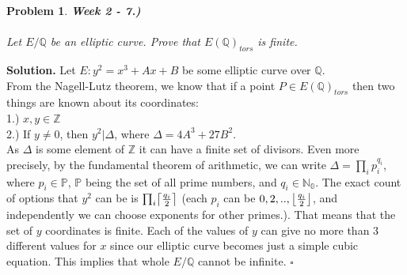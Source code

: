 \documentclass[12pt]{article}
\DeclarePairedDelimiter\ceil{\lceil}{\rceil}
\DeclarePairedDelimiter\floor{\lfloor}{\rfloor}
\newtheorem{problem}{Problem}
\newenvironment{solution}[1][\textbf{Solution}]{\textbf{#1.} }{$\square$}
\begin{document}
\begin{problem} \textbf{Week 2 - 7.)} \\ \\
Let $E/\mathbb{Q}$ be an elliptic curve. Prove that $E(\mathbb{Q})_{tors}$ is finite.
\end{problem}
\begin{solution}
Let $E: y^2 = x^3 + Ax + B$ be some elliptic curve over $\mathbb{Q}$. \\
From the Nagell-Lutz theorem, we know that if a point $P \in E(\mathbb{Q})_{tors}$ then two things are known about its coordinates: \\

1.) $x, y \in \mathbb{Z}$ \\

2.) If $y \neq 0$, then $y^2 | \Delta$, where $\Delta = 4A^3 + 27B^2$. \\

As $\Delta$ is some element of $\mathbb{Z}$ it can have a finite set of divisors. Even more precisely, by the fundamental theorem of arithmetic, we can write $\Delta = \prod_i p_i^{q_i}$, where $p_i \in \mathbb{P}$, $\mathbb{P}$ being the set of all prime numbers, and $q_i \in \mathbb{N_0}$.
The exact count of options that $y^2$ can be is $\prod_i \ceil*{\frac{q_i}{2}}$ (each $p_i$ can be ${0, 2, .., \floor*{\frac{q_i}{2}}}$, and independently we can choose exponents for other primes.).
That means that the set of $y$ coordinates is finite. Each of the values of $y$ can give no more than $3$ different values for $x$ since our elliptic curve becomes just a simple cubic equation. This implies that whole $E/\mathbb{Q}$ cannot be infinite.
\end{solution}
\end{document}
